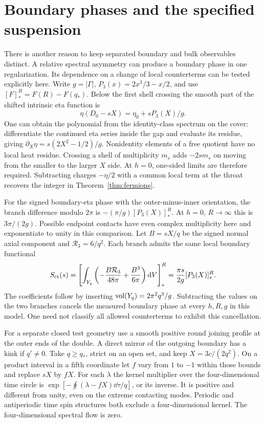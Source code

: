 \section{Boundary phases and the specified suspension}\label{sec:phase}
There is another reason to keep separated boundary and bulk observables distinct. A relative spectral asymmetry can produce a boundary phase in one regularization. Its dependence on a change of local counterterms can be tested explicitly here. Write $g=|\Gamma|$, $P_3(x)=2x^3/3-x/2$, and use $[F]_*^R=F(R)-F(q_*)$. Below the first shell crossing the smooth part of the shifted intrinsic eta function is
\[
 \eta(D_0-sX)=\eta_0+sP_3(X)/g .
\]
One can obtain the polynomial from the identity-class spectrum on the cover: differentiate the continued eta series inside the gap and evaluate its residue, giving $\partial_X\eta=s(2X^2-1/2)/g$. Nonidentity elements of a free quotient have no local heat residue. Crossing a shell of multiplicity $m_s$ adds $-2s m_s$ on moving from the smaller to the larger $X$ side. At $h=0$, one-sided limits are therefore required. Subtracting charges $-\eta/2$ with a common local term at the throat recovers the integer in Theorem~\ref{thm:fermions}.

For the signed boundary-eta phase with the outer-minus-inner orientation, the branch difference modulo $2\pi$ is $-(\pi/g)[P_3(X)]_*^R$. At $h=0$, $R\to\infty$ this is $3\pi/(2g)$. Possible endpoint contacts have even complex multiplicity here and exponentiate to unity in this comparison. Let $B=sX/q$ be the signed normal axial component and $\mathcal R_3=6/q^2$. Each branch admits the same local boundary functional
\begin{equation}
 S_{\rm ct}(s)=
 \left[\int_{Y_q}\left(-\frac{B\mathcal R_3}{48\pi}
                   +\frac{B^3}{6\pi}\right)\mathrm d V\right]_*^R
 =\frac{\pi s}{2g}[P_3(X)]_*^R .
 \label{eq:ct}
\end{equation}
The coefficients follow by inserting $\operatorname{vol}(Y_q)=2\pi^2q^3/g$. Subtracting the values on the two branches cancels the measured boundary phase at every $h,R,g$ in this model. One need not classify all allowed counterterms to exhibit this cancellation.

For a separate closed test geometry use a smooth positive round joining profile at the outer ends of the double. A direct mirror of the outgoing boundary has a kink if $q'\ne0$. Take $q\ge q_*$, strict on an open set, and keep $X=3c/(2q^2)$. On a product interval in a fifth coordinate let $f$ vary from $1$ to $-1$ within those bounds and replace $sX$ by $fX$. For each $\lambda$ the kernel multiplier over the four-dimensional time circle is $\exp[-\oint(\lambda-fX)\dd\tau/q]$, or its inverse. It is positive and different from unity, even on the extreme contacting modes. Periodic and antiperiodic time spin structures both exclude a four-dimensional kernel. The four-dimensional spectral flow is zero.

